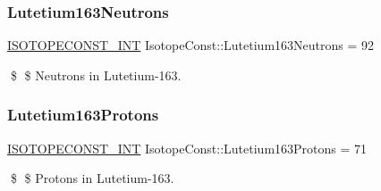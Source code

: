 \subsubsection{\texorpdfstring{Lutetium163\+Neutrons}{Lutetium163Neutrons}}
{\footnotesize\ttfamily \mbox{\hyperlink{group___isotope_const-_macros_ga5f18360b3e99483a35c32d789e62621c}{I\+S\+O\+T\+O\+P\+E\+C\+O\+N\+S\+T\+\_\+\+I\+NT}} Isotope\+Const\+::\+Lutetium163\+Neutrons = 92}

\$ \$ Neutrons in Lutetium-\/163. \mbox{\label{group___isotope_const-_lutetium-_lu163_gaaa7e1a467bcb1aa90b1e0cb8554d4be0}} 
\subsubsection{\texorpdfstring{Lutetium163\+Protons}{Lutetium163Protons}}
{\footnotesize\ttfamily \mbox{\hyperlink{group___isotope_const-_macros_ga5f18360b3e99483a35c32d789e62621c}{I\+S\+O\+T\+O\+P\+E\+C\+O\+N\+S\+T\+\_\+\+I\+NT}} Isotope\+Const\+::\+Lutetium163\+Protons = 71}

\$ \$ Protons in Lutetium-\/163. 